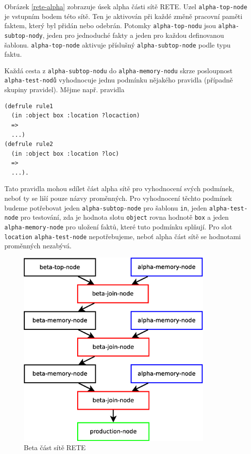 Obrázek \ref{rete-alpha} zobrazuje úsek alpha části sítě RETE. Uzel
\verb|alpha-top-node| je vstupním bodem této sítě. Ten je aktivován při každé
změně pracovní paměti faktem, který byl přidán nebo odebrán. Potomky
\verb|alpha-top-nodu| jsou \verb|alpha-subtop-nody|, jeden pro jednoduché fakty
a jeden pro každou definovanou šablonu. \verb|alpha-top-node| aktivuje příslušný
\verb|alpha-subtop-node| podle typu faktu.

Každá cesta z \verb|alpha-subtop-nodu| do \verb|alpha-memory-nodu| skrze
posloupnost \verb|alpha-test-nodů| vyhodnocuje jednu podmínku nějakého pravidla
(případně skupiny pravidel). Mějme např. pravidla
\begin{verbatim}
(defrule rule1
  (in :object box :location ?locaction)
  =>
  ...)
(defrule rule2
  (in :object box :location ?loc)
  =>
  ...).
\end{verbatim}
Tato pravidla mohou sdílet část alpha sítě pro vyhodnocení svých podmínek, neboť
ty se liší pouze názvy proměnných. Pro vyhodnocení těchto podmínek budeme
potřebovat jeden \verb|alpha-subtop-node| pro šablonu \verb|in|, jeden
\verb|alpha-test-node| pro testování, zda je hodnota slotu \verb|object| rovna
hodnotě \verb|box| a jeden \verb|alpha-memory-node| pro uložení faktů, které
tuto podmínku splňují. Pro slot \verb|location| \verb|alpha-test-node|
nepotřebujeme, neboť alpha část sítě se hodnotami proměnných nezabývá.

\begin{figure}[h]
\centering
\includegraphics[height=10cm]{rete-beta.eps}
\caption{Beta část sítě RETE}
\label{rete-beta}
\end{figure}

